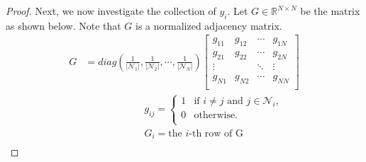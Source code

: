 \documentclass[11pt, a4paper, oneside, openany, reqno]{book}
\theoremstyle{definition}
\theoremstyle{remark}
\numberwithin{equation}{chapter} %
\newcommand{\R}{\ensuremath{{\mathbb R}}}
\newcommand{\NBR}{\mathcal{N}}
\begin{document}
\begin{proof}
	Next, we now investigate the collection of $ y_i $.
	Let $ G \in \R^{N \times N}$ be the matrix as shown below. 
	Note that $ G $ is a normalized adjacency matrix.
	\begin{equation}\begin{split}\label{matrixg}
	G&=diag(\frac{1}{\vert \NBR_1 \vert},\frac{1}{\vert \NBR_2 \vert}  ,\cdots, 
	\frac{1}{\vert \NBR_N \vert} ) 
	\left[ \begin{array}{cccc} g_{11} & g_{12} & \cdots & g_{1N} \\
	g_{21} & g_{22} & \cdots & g_{2N} \\
	\vdots &  & \ddots & \vdots \\
	g_{N1} & g_{N2} & \cdots & g_{NN} \\ \end{array} \right] \\	
	& \qquad\qquad\qquad g_{ij} = \begin{cases}
	1 & \text{if } i \neq j \text{ and } j \in \NBR_i ,\\
	0 & \text{otherwise.}\\
	\end{cases} \\
	& \qquad\qquad\qquad G_i = \text{the $i$-th row of G} \\	
	\end{split}\end{equation}
		

\end{proof}
\end{document}
